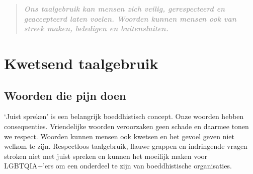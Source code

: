 \documentclass[12pt,openany]{book}
\begin{document}
\newpage
\thispagestyle{empty}
\begin{figure}[h]
    \centering
\end{figure}

\begin{quote}
\centering
\doublespacing
\textit{\Large \textbf{\textcolor{darkgray}{Ons taalgebruik kan mensen zich veilig, gerespecteerd en geaccepteerd laten voelen. Woorden kunnen mensen ook van streek maken, beledigen en buitensluiten.}}}
\end{quote}

\chapter*{Kwetsend taalgebruik}

\section*{Woorden die pijn doen}

`Juist spreken' is een belangrijk boeddhistisch concept. Onze woorden hebben consequenties. Vriendelijke woorden veroorzaken geen schade en daarmee tonen we respect. Woorden kunnen mensen ook kwetsen en het gevoel geven niet welkom te zijn. Respectloos taalgebruik, flauwe grappen en indringende vragen stroken niet met juist spreken en kunnen het moeilijk maken voor LGBTQIA+'ers om een onderdeel te zijn van boeddhistische organisaties.
\end{document}
